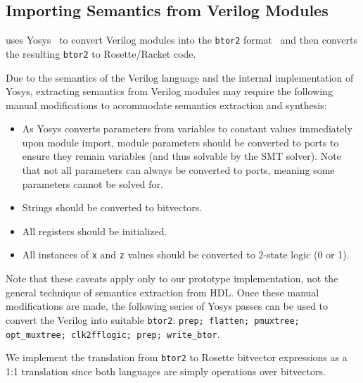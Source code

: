   
\subsection{Importing Semantics from Verilog Modules}
\label{sec:implementation:importing-semantics}

\lr uses 
  Yosys~\cite{wolf2013yosys}
  to convert Verilog modules
  into the \texttt{btor2} format~\cite{btor} %
  and then converts the resulting \texttt{btor2}
  to Rosette/Racket code.

Due to the semantics of the Verilog language
  and the internal implementation of Yosys,
  extracting semantics from Verilog modules
  may require the following manual modifications
  to accommodate semantics extraction and synthesis:
  
\begin{itemize}[leftmargin=*]
\item As Yosys converts
  parameters from variables
  to constant values
  immediately upon module import,
  module parameters should be converted to
  ports
  to ensure they remain variables
  (and thus solvable by the SMT solver).
Note that not all parameters 
  can always be converted to ports,
  meaning some parameters cannot be solved for.
\item Strings should be converted to bitvectors.
\item All registers should be initialized.
\item All instances of \texttt{x} and \texttt{z} values should be  
  converted to 2-state logic (0 or 1).
\end{itemize}
Note that these caveats
  apply only 
  to our prototype implementation,
  not the general technique
  of semantics extraction from HDL.
Once these manual modifications are made,
  the following series of Yosys passes
  can be used to convert the Verilog
  into suitable \texttt{btor2}:
\texttt{prep; flatten; pmuxtree; opt_muxtree; clk2fflogic; prep; write_btor}.

We implement
  the translation from \texttt{btor2}
  to Rosette bitvector expressions
  as a 1:1 translation 
  since both languages
  are simply operations over bitvectors.


